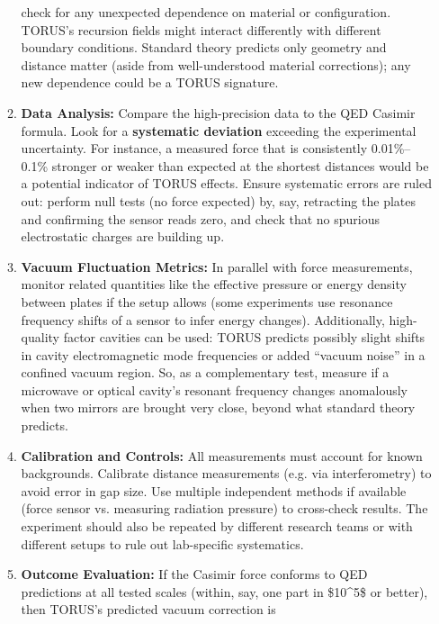 \documentclass[
]{article}
\begin{document}
\begin{itemize}
\begin{enumerate}
    check for any unexpected dependence on material or configuration.
    TORUS's recursion fields might interact differently with different
    boundary conditions\hspace{0pt}. Standard theory predicts only
    geometry and distance matter (aside from well-understood material
    corrections); any new dependence could be a TORUS signature.
  \item
    \textbf{Data Analysis:} Compare the high-precision data to the QED
    Casimir formula. Look for a \textbf{systematic deviation} exceeding
    the experimental uncertainty. For instance, a measured force that is
    consistently 0.01\%--0.1\% stronger or weaker than expected at the
    shortest distances would be a potential indicator of TORUS
    effects\hspace{0pt}. Ensure systematic errors are ruled out: perform
    null tests (no force expected) by, say, retracting the plates and
    confirming the sensor reads zero, and check that no spurious
    electrostatic charges are building up.
  \item
    \textbf{Vacuum Fluctuation Metrics:} In parallel with force
    measurements, monitor related quantities like the effective pressure
    or energy density between plates if the setup allows (some
    experiments use resonance frequency shifts of a sensor to infer
    energy changes). Additionally, high-quality factor cavities can be
    used: TORUS predicts possibly slight shifts in cavity
    electromagnetic mode frequencies or added ``vacuum noise'' in a
    confined vacuum region\hspace{0pt}. So, as a complementary test,
    measure if a microwave or optical cavity's resonant frequency
    changes anomalously when two mirrors are brought very close, beyond
    what standard theory predicts.
  \item
    \textbf{Calibration and Controls:} All measurements must account for
    known backgrounds. Calibrate distance measurements (e.g. via
    interferometry) to avoid error in gap size. Use multiple independent
    methods if available (force sensor vs. measuring radiation pressure)
    to cross-check results. The experiment should also be repeated by
    different research teams or with different setups to rule out
    lab-specific systematics.
  \item
    \textbf{Outcome Evaluation:} If the Casimir force conforms to QED
    predictions at all tested scales (within, say, one part in
    \$10\^{}5\$ or better), then TORUS's predicted vacuum correction is

\end{enumerate}
\end{itemize}
\end{document}
